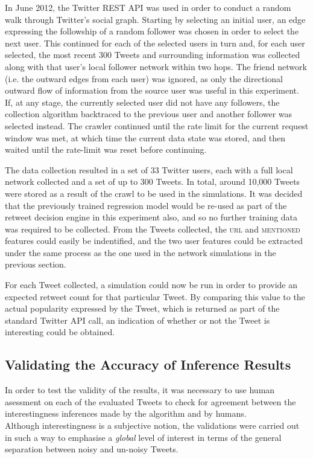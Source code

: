 In June 2012, the Twitter REST API was used in order to conduct a random walk through Twitter's social graph. Starting by selecting an initial user, an edge expressing the followship of a random follower was chosen in order to select the next user. This continued for each of the selected users in turn and, for each user selected, the most recent 300 Tweets and surrounding information was collected along with that user's local follower network within two hops. The friend network (i.e. the outward edges from each user) was ignored, as only the directional outward flow of information from the source user was useful in this experiment.\\
If, at any stage, the currently selected user did not have any followers, the collection algorithm backtraced to the previous user and another follower was selected instead. The crawler continued until the rate limit for the current request window was met, at which time the current data state was stored, and then waited until the rate-limit was reset before continuing.

The data collection resulted in a set of 33 Twitter users, each with a full local network collected and a set of up to 300 Tweets. In total, around 10,000 Tweets were stored as a result of the crawl to be used in the simulations. It was decided that the previously trained regression model would be re-used as part of the retweet decision engine in this experiment also, and so no further training data was required to be collected. From the Tweets collected, the \textsc{url} and \textsc{mentioned} features could easily be indentified, and the two user features could be extracted under the same process as the one used in the network simulations in the previous section.

For each Tweet collected, a simulation could now be run in order to provide an expected retweet count for that particular Tweet. By comparing this value to the actual popularity expressed by the Tweet, which is returned as part of the standard Twitter API call, an indication of whether or not the Tweet is interesting could be obtained.



\subsection{Validating the Accuracy of Inference Results}
In order to test the validity of the results, it was necessary to use human asessment on each of the evaluated Tweets to check for agreement between the interestingness inferences made by the algorithm and by humans.\\
Although interestingness is a subjective notion, the validations were carried out in such a way to emphasise a \textit{global} level of interest in terms of the general separation between noisy and un-noisy Tweets.


